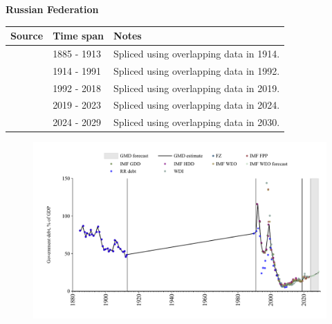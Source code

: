 \documentclass[12pt,a4paper,landscape]{article}
\begin{document}
\begin{adjustbox}{max totalsize={\paperwidth}{\paperheight},center}
\begin{minipage}[t][\textheight][t]{\textwidth}
\vspace*{0.5cm}
{}
\begin{center}
{\Large\bfseries Russian Federation}
\end{center}
\vspace{0.5cm}
\begin{table}[H]
\centering
\small
\begin{tabular}{|l|l|l|}
\hline
\textbf{Source} & \textbf{Time span} & \textbf{Notes} \\
\hline
\rowcolor{white}\cite{IMF_FPP}& 1885 - 1913 &Spliced using overlapping data in 1914.\\
\rowcolor{lightgray}\cite{RR_debt}& 1914 - 1991 &Spliced using overlapping data in 1992.\\
\rowcolor{white}\cite{IMF_GDD}& 1992 - 2018 &Spliced using overlapping data in 2019.\\
\rowcolor{lightgray}\cite{IMF_FPP}& 2019 - 2023 &Spliced using overlapping data in 2024.\\
\rowcolor{white}\cite{IMF_WEO_forecast}& 2024 - 2029 &Spliced using overlapping data in 2030.\\
\hline
\end{tabular}
\end{table}
\begin{figure}[H]
\centering
\includegraphics[width=\textwidth,height=0.6\textheight,keepaspectratio]{graphs/RUS_govdebt_GDP.pdf}
\end{figure}
\end{minipage}
\end{adjustbox}
\end{document}
